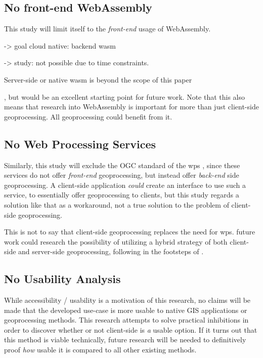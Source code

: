 \subsection*{ No front-end WebAssembly } 
This study will limit itself to the \emph{front-end} usage of WebAssembly. 

-> goal cloud native: backend wasm

-> study: not possible due to time constraints.

Server-side or native wasm is beyond the scope of this paper

, but would be an excellent starting point for future work. Note that this also means that research into WebAssembly is important for more than just client-side geoprocessing. All geoprocessing could benefit from it.



\subsection*{ No Web Processing Services } 
Similarly, this study will exclude the OGC standard of the \ac{wps} \cite{ogc_web_2015}, since these services do not offer \emph{front-end} geoprocessing, but instead offer \emph{back-end} side geoprocessing. A client-side application \textit{could} create an interface to use such a service, to essentially offer geoprocessing to clients, but this study regards a solution like that as a workaround, not a true solution to the problem of client-side geoprocessing. 

This is not to say that client-side geoprocessing replaces the need for \ac{wps}. 
future work could research the possibility of utilizing a hybrid strategy of both client-side and server-side geoprocessing, following in the footsteps of \cite{panidi_hybrid_2015}. 



\subsection*{ No Usability Analysis } %
While accessibility / usability is a motivation of this research, no claims will be made that the developed use-case is more usable to native GIS applications or geoprocessing methods. This research attempts to solve practical inhibitions in order to discover whether or not client-side is \emph{a} usable option. If it turns out that this method is viable technically, future research will be needed to definitively proof \emph{how} usable it is compared to all other existing methods.  

